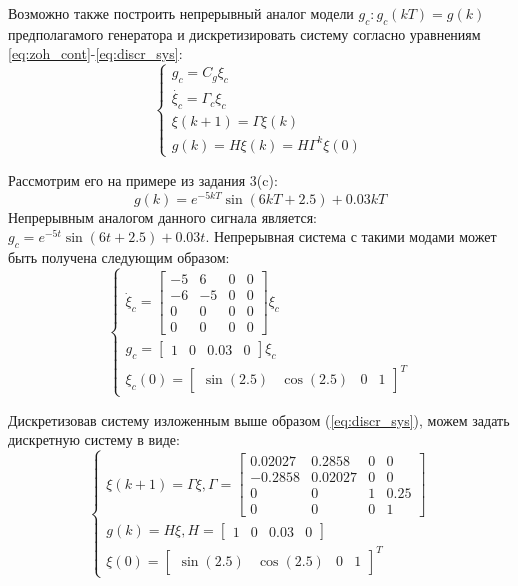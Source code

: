 \documentclass[a4paper, 14pt]{extarticle}
\theoremstyle{definition}
\theoremstyle{plain}
\theoremstyle{remark}
\begin{document}
Возможно также построить непрерывный аналог модели $g_c: g_{c}(kT) = g(k)$ предполагамого генератора и дискретизировать систему согласно уравнениям \ref{eq:zoh_cont}-\ref{eq:discr_sys}:
\begin{equation}
	\begin{cases}
		g_c = C_g \xi_c \\
		\dot{\xi_c} = \Gamma_c\xi_c\\
		\xi(k+1) = \Gamma \xi(k) \\
		g(k) = H\xi(k) = H\Gamma^k\xi(0)
	\end{cases}
\end{equation}

Рассмотрим его на примере из задания 3(c):
\begin{equation}\label{eq:gen2}
	g(k) = e^{-5kT}\sin(6kT+2.5) + 0.03kT
\end{equation}
Непрерывным аналогом данного сигнала является: $g_c=e^{-5t}\sin(6t+2.5) + 0.03t$. Непрерывная система с такими модами может быть получена следующим образом:
\begin{equation}
	\begin{cases}
		\dot{\xi}_c = \begin{bmatrix}
			-5 & 6 & 0 & 0 \\ -6 & -5 & 0 & 0 \\ 0 & 0 & 0 & 0 \\ 0 & 0 & 0 & 0
		\end{bmatrix}\xi_c \\
		g_c = \begin{bmatrix}
			1 & 0 & 0.03 & 0
		\end{bmatrix}\xi_c\\
		\xi_c(0) = \begin{bmatrix}
			\sin(2.5) & \cos(2.5) & 0 & 1
		\end{bmatrix}^T
	\end{cases}
\end{equation}

Дискретизовав систему изложенным выше образом (\ref{eq:discr_sys}), можем задать дискретную систему в виде:
\begin{equation} \label{eq:gen2_sys}
	\begin{cases}
		\xi(k+1) = \Gamma\xi, \Gamma=\begin{bmatrix}
			0.02027 & 0.2858 & 0 & 0 \\ -0.2858 & 0.02027 & 0 & 0 \\ 0 & 0 & 1 & 0.25 \\ 0 & 0 & 0 & 1
		\end{bmatrix} \\
		g(k) = H\xi, H = \begin{bmatrix}
			1 & 0 & 0.03 & 0
		\end{bmatrix} \\
		\xi(0) = \begin{bmatrix}
			\sin(2.5) & \cos(2.5) & 0 & 1
		\end{bmatrix}^T
	\end{cases}
\end{equation}
\end{document}
